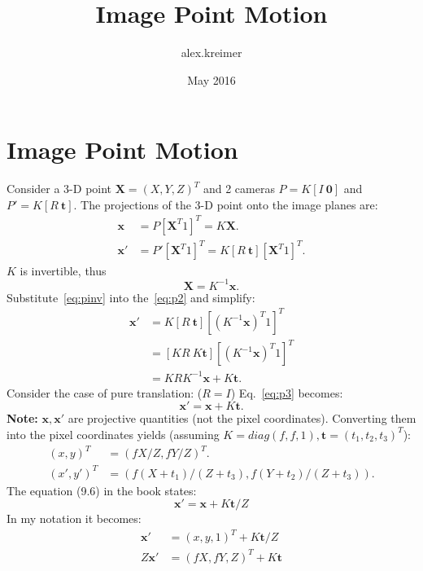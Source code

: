 \documentclass{article}
\title{Image Point Motion}
\author{alex.kreimer}
\date{May 2016}
\begin{document}
\maketitle

\section{Image Point Motion}

Consider a 3-D point $\mathbf{X}=(X,Y,Z)^T$ and 2 cameras $P = K[I\ \mathbf{0}]$ and $P' = K[R\ \mathbf{t}]$.  The projections of the 3-D point onto the image planes are:
\begin{align}
\mathbf{x} &= P[\mathbf{X}^T1 ]^T = K\mathbf{X}.\\
\mathbf{x}' &= P'[\mathbf{X}^T1 ]^T = K[R\ \mathbf{t}][\mathbf{X}^T1 ]^T\label{eq:p2}.
\end{align}
$K$ is invertible, thus
\begin{equation}\label{eq:pinv}
\mathbf{X} = K^{-1}\mathbf{x}.
\end{equation}
Substitute~\ref{eq:pinv} into the~\ref{eq:p2} and simplify:
\begin{align}
\mathbf{x}' &=  K[R\ \mathbf{t}][(K^{-1}\mathbf{x})^T 1]^T\\
  &= [KR\ K\mathbf{t}][(K^{-1}\mathbf{x})^T 1]^T\\
  &= KRK^{-1}\mathbf{x} + K\mathbf{t}\label{eq:p3}.
\end{align}
Consider the case of pure translation: ($R=I$) Eq.~\ref{eq:p3}
becomes:
\begin{equation}
\mathbf{x}' = \mathbf{x} + K\mathbf{t}\label{eq:p4}.
\end{equation}
\textbf{Note:} $\mathbf{x},\mathbf{x}'$ are projective quantities (not the pixel coordinates). Converting them into the pixel coordinates yields (assuming $K = diag(f,f,1), \mathbf{t}=(t_1,t_2,t_3)^T$):
\begin{align}
(x,y)^T &= (fX/Z,fY/Z)^T.\\
(x',y')^T &= (f(X+t_1)/(Z+t_3),f(Y+t_2)/(Z+t_3)).
\end{align}
The equation (9.6) in the book states:
\begin{equation}
\mathbf{x}' = \mathbf{x} + K\mathbf{t}/Z
\end{equation}
In my notation it becomes:
\begin{align}
\mathbf{x}' &= (x,y,1)^T + K\mathbf{t}/Z\\
Z\mathbf{x}' &= (fX,fY,Z)^T + K\mathbf{t}
\end{align}
\end{document}
